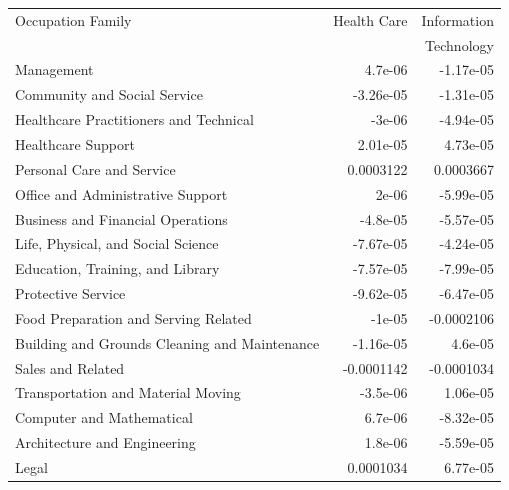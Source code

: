 \documentclass[letterpaper]{article} %
\begin{document}
\begin{table}[h!]
\centering
\scriptsize
\begin{tabular}{l | r | r}
                                 Occupation Family & Health Care & Information \\
                                                   &             & Technology \\
\hline \hline
                            Management          &     4.7e-06 &              -1.17e-05 \\
          Community and Social Service          &   -3.26e-05 &              -1.31e-05 \\
 Healthcare Practitioners and Technical         &      -3e-06 &              -4.94e-05 \\
                    Healthcare Support          &    2.01e-05 &               4.73e-05 \\
             Personal Care and Service          &   0.0003122 &              0.0003667 \\
     Office and Administrative Support          &       2e-06 &              -5.99e-05 \\
     Business and Financial Operations          &    -4.8e-05 &              -5.57e-05 \\
    Life, Physical, and Social Science          &   -7.67e-05 &              -4.24e-05 \\
      Education, Training, and Library          &   -7.57e-05 &              -7.99e-05 \\
                    Protective Service          &   -9.62e-05 &              -6.47e-05 \\
  Food Preparation and Serving Related          &      -1e-05 &             -0.0002106 \\
 Building and Grounds Cleaning and Maintenance  &   -1.16e-05 &                4.6e-05 \\
                     Sales and Related          &  -0.0001142 &             -0.0001034 \\
    Transportation and Material Moving          &    -3.5e-06 &               1.06e-05 \\
             Computer and Mathematical          &     6.7e-06 &              -8.32e-05 \\
          Architecture and Engineering          &     1.8e-06 &              -5.59e-05 \\
                                 Legal          &   0.0001034 &               6.77e-05 \\

\end{tabular}
\end{table}
\end{document}
